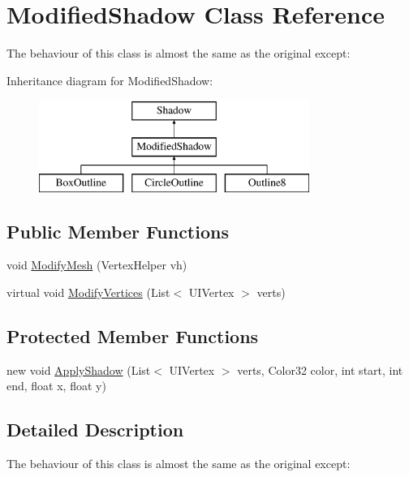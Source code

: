 \hypertarget{class_modified_shadow}{}\section{Modified\+Shadow Class Reference}
\label{class_modified_shadow}


The behaviour of this class is almost the same as the original except\+:  


Inheritance diagram for Modified\+Shadow\+:\begin{figure}[H]
\begin{center}
\leavevmode
\includegraphics[height=3.000000cm]{class_modified_shadow}
\end{center}
\end{figure}
\subsection*{Public Member Functions}
\begin{DoxyCompactItemize}
\item 
void \mbox{\hyperlink{class_modified_shadow_a89b5a823f795cc3c2f94cfb06d8a995d}{Modify\+Mesh}} (Vertex\+Helper vh)
\item 
virtual void \mbox{\hyperlink{class_modified_shadow_ac1651effd229c1fd2f454eccc2cf225c}{Modify\+Vertices}} (List$<$ U\+I\+Vertex $>$ verts)
\end{DoxyCompactItemize}
\subsection*{Protected Member Functions}
\begin{DoxyCompactItemize}
\item 
new void \mbox{\hyperlink{class_modified_shadow_a3dd596a0cb967c4a45f107938194e46a}{Apply\+Shadow}} (List$<$ U\+I\+Vertex $>$ verts, Color32 color, int start, int end, float x, float y)
\end{DoxyCompactItemize}


\subsection{Detailed Description}
The behaviour of this class is almost the same as the original except\+: 


